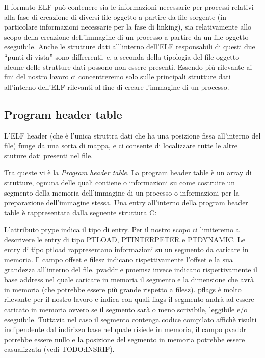 Il formato ELF può contenere sia le informazioni necessarie per
processi relativi alla fase di creazione di diversi file oggetto a
partire da file sorgente (in particolare informazioni necessarie per
la fase di linking), sia relativamente allo scopo della creazione
dell'immagine di un processo a partire da un file oggetto
eseguibile. Anche le strutture dati all'interno dell'ELF responsabili
di questi due ``punti di vista'' sono diffrerenti, e, a seconda della
tipologia del file oggetto alcune delle strutture dati possono non
essere presenti. Essendo più rilevante ai fini del nostro lavoro ci
concentreremo solo sulle principali strutture dati all'interno
dell'ELF rilevanti al fine di creare l'immagine di un processo.

\subsection{Program header table}

L'ELF header (che è l'unica struttra dati che ha una posizione fissa
all'interno del file) funge da una sorta di mappa, e ci consente di
localizzare tutte le altre stuture dati presenti nel file.

Tra queste vi è la \emph{Program header table}. La program header table è
un array di strutture, ognuna delle quali contiene o informazioni su
come costruire un segmento della memoria dell'immagine di un processo
o informazioni per la preparazione dell'immagine stessa. Una entry
all'interno della program header table è rappresentata dalla seguente
struttura C:



L'attributo ptype indica il tipo di entry. Per il nostro scopo ci
limiteremo a descrivere le entry di tipo PTLOAD, PTINTERPETER e
PTDYNAMIC. Le entry di tipo ptload rappresentano informazioni su un
segmento da caricare in memoria. Il campo offset e filesz indicano
rispettivamente l'offset e la sua grandezza all'interno del
file. pvaddr e pmemsz invece indicano rispettivamente il base
address nel quale caricare in memoria il segmento e la dimensione che
avrà in memoria (che potrebbe essere più grande rispetto a
filesz). pflags è molto rilevante per il nostro lavoro e indica con
quali flags il segmento andrà ad essere caricato in memoria ovvero se
il segmento sarà o meno scrivibile, leggibile e/o eseguibile. Tuttavia
nel caso il segmento contenga codice compilato affichè risulti
indipendente dal indirizzo base nel quale risiede in memoria, il campo
pvaddr potrebbe essere nullo e la posizione del segmento in memoria
potrebbe essere casualizzata (vedi TODO:INSRIF).


